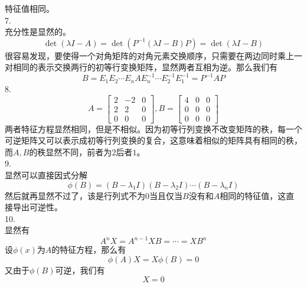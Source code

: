 \documentclass[utf8]{ctexart}
\begin{document}
特征值相同。\\
7.\\
充分性是显然的。
\[\det(\lambda I-A)=\det(P^{-1}(\lambda I-B)P)=\det(\lambda I-B)\]
很容易发现，要使得一个对角矩阵的对角元素交换顺序，只需要在两边同时乘上一对相同的表示交换两行的初等行变换矩阵，显然两者互相为逆。那么我们有
\[B=E_1E_2\cdots E_nAE_n^{-1}\cdots E_2^{-1}E_1^{-1}=P^{-1}AP\]
8.\\
\[A=\begin{bmatrix}
	2&-2&0\\
	2&2&0\\
	0&0&0
\end{bmatrix},
B=\begin{bmatrix}
	4&0&0\\
	0&0&0\\
	0&0&0
\end{bmatrix}\]
两者特征方程显然相同，但是不相似。因为初等行列变换不改变矩阵的秩，每一个可逆矩阵又可以表示成初等行列变换的复合，这意味着相似的矩阵具有相同的秩，而$A,B$的秩显然不同，前者为$2$后者$1$。\\
9.\\
显然可以直接因式分解
\[\phi(B)=(B-\lambda_1I)(B-\lambda_2I)\cdots(B-\lambda_nI)\]
然后就再显然不过了，该是行列式不为$0$当且仅当$B$没有和$A$相同的特征值，这直接导出可逆性。\\
10.\\
显然有
\[A^nX=A^{n-1}XB=\cdots=XB^n\]
设$\phi(x)$为$A$的特征方程，那么有
\[\phi(A)X=X\phi(B)=0\]
又由于$\phi(B)$可逆，我们有
\[X=0\]
\end{document}
